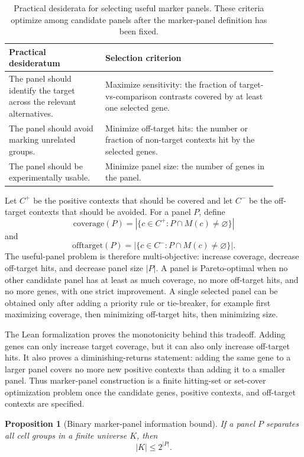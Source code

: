 \documentclass{article}
\newtheorem{proposition}{Proposition}
\begin{document}
\begin{table}[h]
\centering
\small
\begin{tabular}{p{0.32\linewidth}p{0.58\linewidth}}
\toprule
Practical desideratum & Selection criterion \\
\midrule
The panel should identify the target across the relevant alternatives. & Maximize sensitivity: the fraction of target-vs-comparison contrasts covered by at least one selected gene. \\
The panel should avoid marking unrelated groups. & Minimize off-target hits: the number or fraction of non-target contexts hit by the selected genes. \\
The panel should be experimentally usable. & Minimize panel size: the number of genes in the panel. \\
\bottomrule
\end{tabular}
\caption{Practical desiderata for selecting useful marker panels. These criteria optimize among candidate panels after the marker-panel definition has been fixed.}
\label{tab:marker-panel-selection-desiderata}
\end{table}

Let $C^{+}$ be the positive contexts that should be covered and let $C^{-}$ be the off-target contexts that should be avoided. For a panel $P$, define
\[
  \mathrm{coverage}(P)
  =
  \left|\{c\in C^{+}:P\cap M(c)\neq\varnothing\}\right|
\]
and
\[
  \mathrm{offtarget}(P)
  =
  \left|\{c\in C^{-}:P\cap M(c)\neq\varnothing\}\right|.
\]
The useful-panel problem is therefore multi-objective: increase coverage, decrease off-target hits, and decrease panel size $|P|$. A panel is Pareto-optimal when no other candidate panel has at least as much coverage, no more off-target hits, and no more genes, with one strict improvement. A single selected panel can be obtained only after adding a priority rule or tie-breaker, for example first maximizing coverage, then minimizing off-target hits, then minimizing size.

The Lean formalization proves the monotonicity behind this tradeoff. Adding genes can only increase target coverage, but it can also only increase off-target hits. It also proves a diminishing-returns statement: adding the same gene to a larger panel covers no more new positive contexts than adding it to a smaller panel. Thus marker-panel construction is a finite hitting-set or set-cover optimization problem once the candidate genes, positive contexts, and off-target contexts are specified.

\begin{proposition}[Binary marker-panel information bound]\label{prop:marker-panel-information-bound}
If a panel $P$ separates all cell groups in a finite universe $K$, then
\[
  |K|\leq 2^{|P|}.
\]
\end{proposition}
\end{document}
